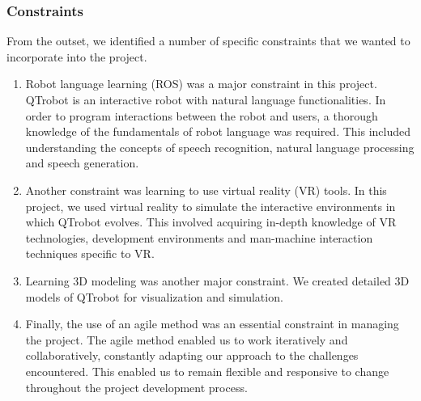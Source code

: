\subsubsection{Constraints}
From the outset, we identified a number of specific constraints that we wanted to incorporate into the project.
\begin{enumerate}
    \item Robot language learning (ROS) was a major constraint in this project. QTrobot is an interactive robot with natural language functionalities. In order to program interactions between the robot and users, a thorough knowledge of the fundamentals of robot language was required. This included understanding the concepts of speech recognition, natural language processing and speech generation.
    
    \item Another constraint was learning to use virtual reality (VR) tools. In this project, we used virtual reality to simulate the interactive environments in which QTrobot evolves. This involved acquiring in-depth knowledge of VR technologies, development environments and man-machine interaction techniques specific to VR.

    \item Learning 3D modeling was another major constraint. We created detailed 3D models of QTrobot for visualization and simulation.
    
    \item Finally, the use of an agile method was an essential constraint in managing the project. The agile method enabled us to work iteratively and collaboratively, constantly adapting our approach to the challenges encountered. This enabled us to remain flexible and responsive to change throughout the project development process.
\end{enumerate}